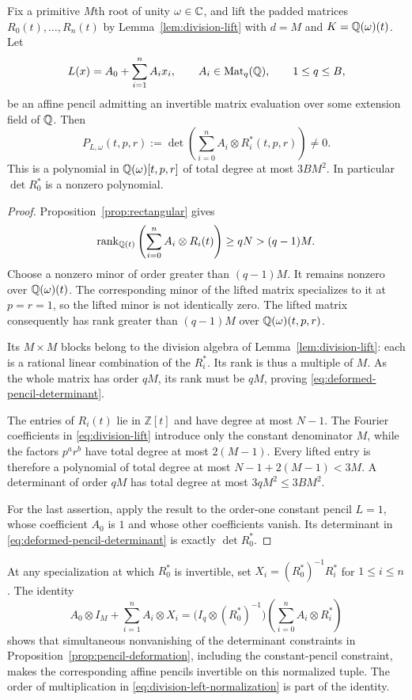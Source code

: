\begin{proposition}\label{prop:pencil-deformation}
Fix a primitive $M$th root of unity $\omega\in\mathbb C$, and lift the
padded matrices $R_0(t),\ldots,R_n(t)$ by
Lemma~\ref{lem:division-lift} with $d=M$ and
$K=\mathbb Q(\omega)(t)$.  Let
\[
  L(x)=A_0+\sum_{i=1}^n A_i x_i,
  \qquad A_i\in\operatorname{Mat}_q(\mathbb Q),\qquad 1\leq q\leq B,
\]
be an affine pencil admitting an invertible matrix evaluation over
some extension field of $\mathbb Q$.  Then
\begin{equation}\label{eq:deformed-pencil-determinant}
  P_{L,\omega}(t,p,r)
   :=\det\!\left(\sum_{i=0}^n A_i\otimes R_i^*(t,p,r)\right)
   \ne0.
\end{equation}
This is a polynomial in $\mathbb Q(\omega)[t,p,r]$ of total degree at most
$3BM^2$.  In particular $\det R_0^*$ is a nonzero polynomial.
\end{proposition}

\begin{proof}
Proposition~\ref{prop:rectangular} gives
\[
  \operatorname{rank}_{\mathbb Q(t)}\left(\sum_{i=0}^n A_i\otimes R_i(t)\right)
      \geq qN>(q-1)M.
\]
Choose a nonzero minor of order greater than $(q-1)M$.
It remains nonzero over $\mathbb Q(\omega)(t)$.  The corresponding minor
of the lifted matrix specializes to it at $p=r=1$, so the lifted
minor is not identically zero.  The lifted matrix consequently has
rank greater than $(q-1)M$ over $\mathbb Q(\omega)(t,p,r)$.

Its $M\times M$ blocks belong to the division algebra of
Lemma~\ref{lem:division-lift}: each is a rational linear combination
of the $R_i^*$.  Its rank is thus a multiple of $M$.  As the whole
matrix has order $qM$, its rank must be $qM$, proving
\eqref{eq:deformed-pencil-determinant}.

The entries of $R_i(t)$ lie in $\mathbb Z[t]$ and have degree at
most $N-1$.  The Fourier coefficients in
\eqref{eq:division-lift} introduce only the constant denominator
$M$, while the factors $p^ar^b$ have total degree at most $2(M-1)$.
Every lifted entry is therefore a polynomial of total degree at
most $N-1+2(M-1)<3M$.  A determinant of order $qM$ has total degree
at most $3qM^2\leq3BM^2$.

For the last assertion, apply the result to the order-one constant
pencil $L=1$, whose coefficient $A_0$ is $1$ and whose other
coefficients vanish.  Its determinant in
\eqref{eq:deformed-pencil-determinant} is exactly $\det R_0^*$.
\end{proof}

At any specialization at which $R_0^*$ is invertible, set
$X_i=(R_0^*)^{-1}R_i^*$ for $1\leq i\leq n$.  The identity
\begin{equation}\label{eq:division-left-normalization}
  A_0\otimes I_M+\sum_{i=1}^n A_i\otimes X_i
  =
  \bigl(I_q\otimes(R_0^*)^{-1}\bigr)
  \left(\sum_{i=0}^n A_i\otimes R_i^*\right)
\end{equation}
shows that simultaneous nonvanishing of the determinant constraints
in Proposition~\ref{prop:pencil-deformation}, including the
constant-pencil constraint, makes the corresponding affine pencils
invertible on this normalized tuple.  The order of multiplication
in \eqref{eq:division-left-normalization} is part of the identity.

